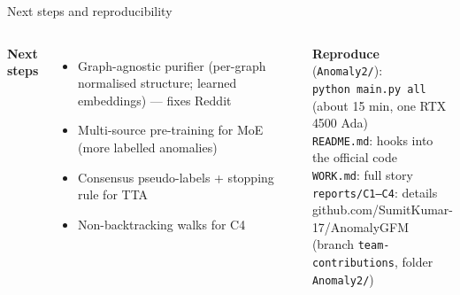 \documentclass[aspectratio=169,11pt]{beamer}
\begin{document}
\begin{frame}{Next steps and reproducibility}
\begin{columns}[T]
\textbf{Next steps}
\begin{itemize}\small
\item Graph-agnostic purifier (per-graph normalised structure; learned embeddings) --- fixes Reddit
\item Multi-source pre-training for MoE (more labelled anomalies)
\item Consensus pseudo-labels + stopping rule for TTA
\item Non-backtracking walks for C4
\end{itemize}
\textbf{Reproduce} (\texttt{Anomaly2/}):\\
\footnotesize\texttt{python main.py all}\\ (about 15 min, one RTX 4500 Ada)\\[4pt]
\texttt{README.md}: hooks into the official code\\ \texttt{WORK.md}: full story\\ \texttt{reports/C1--C4}: details\\[4pt]
\scriptsize github.com/SumitKumar-17/AnomalyGFM\\ (branch \texttt{team-contributions}, folder \texttt{Anomaly2/})
\end{columns}
\end{frame}
\end{document}
